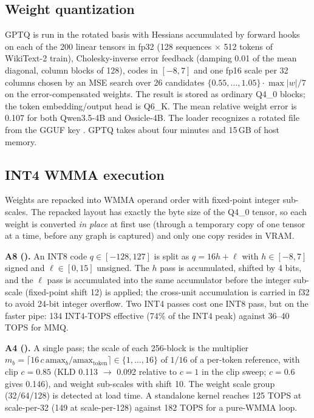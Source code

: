 \documentclass[10.5pt,a4paper]{article}
\newcommand{\tx}[1]{\texttt{\detokenize{#1}}}
\begin{document}
\subsection{Weight quantization}
GPTQ is run in the rotated basis with Hessians accumulated by forward hooks on each of the 200 linear tensors in fp32 (128 sequences $\times$ 512 tokens of WikiText-2 train), Cholesky-inverse
error feedback (damping 0.01 of the mean diagonal, column blocks of 128), codes in $[-8,7]$ and one fp16 scale per 32 columns chosen by an MSE search over 26 candidates
$\{0.55,\ldots,1.05\}\cdot\max|w|/7$ on the error-compensated weights. The result is stored as ordinary Q4\_0 blocks; the token embedding/output head is Q6\_K. The mean relative weight error is
0.107 for both Qwen3.5-4B and Ossicle-4B. The loader recognizes a rotated file from the GGUF key \tx{ossicle.int4_rotation_block}. GPTQ takes about four minutes and 15\,GB of host memory.

\subsection{INT4 WMMA execution}
Weights are repacked into WMMA operand order with fixed-point integer sub-scales. The repacked layout has exactly the byte size of the Q4\_0 tensor, so each weight is converted \emph{in place}
at first use (through a temporary copy of one tensor at a time, before any graph is captured) and only one copy resides in VRAM.

\textbf{A8 (\tx{quality}).} An INT8 code $q\in[-128,127]$ is split as $q=16h+\ell$ with $h\in[-8,7]$ signed and $\ell\in[0,15]$ unsigned. The $h$ pass is accumulated, shifted by 4 bits, and the
$\ell$ pass is accumulated into the same accumulator before the integer sub-scale (fixed-point shift 12) is applied; the cross-unit accumulation is carried in f32 to avoid 24-bit integer overflow.
Two INT4 passes cost one INT8 pass, but on the faster pipe: 134 INT4-TOPS effective (74\% of the INT4 peak) against 36--40 TOPS for MMQ.

\textbf{A4 (\tx{fast}).} A single pass; the scale of each 256-block is the multiplier $m_b=\lceil16\,c\,\mathrm{amax}_b/\mathrm{amax}_{\text{token}}\rceil\in\{1,\ldots,16\}$ of $1/16$ of a per-token
reference, with clip $c=0.85$ (KLD 0.113 $\to$ 0.092 relative to $c=1$ in the clip sweep; $c=0.6$ gives 0.146), and weight sub-scales with shift 10. The weight scale group (32/64/128) is detected at load time.
A standalone kernel reaches 125 TOPS at scale-per-32 (149 at scale-per-128) against 182 TOPS for a pure-WMMA loop.
\end{document}
